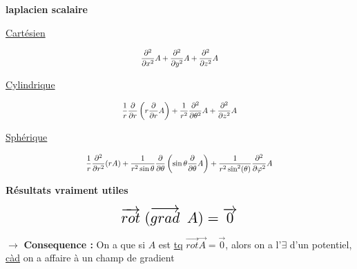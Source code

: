 \documentclass{article}
\newcommand{\vtab} {\vspace{0.4cm}}
\begin{document}
\begin{center}
	{\huge \textbf{laplacien scalaire}}
\end{center}

\vtab

\begin{center}
\begin{multicols}{3}
		{\Large \underline{Cartésien}} \\
\vtab

			$$\scalebox{0.8}{$\displaystyle \frac{\partial^2}{\partial x^2} A + \frac{\partial^2}{\partial y^2} A + \frac{\partial^2}{\partial z^2} A$}$$

	\columnbreak
		{\Large \underline{Cylindrique}} \\

\vtab

	$$\scalebox{0.8}{$\displaystyle \frac{1}{r} \frac{\partial}{\partial r} \left(r \frac{\partial}{\partial r} A \right) + \frac{1}{r^2}\frac{\partial^2}{\partial \theta^2} A + \frac{\partial^2}{\partial z^2} A $}$$

	
	\columnbreak
		{\Large \underline{Sphérique}} \\

\vtab

	$$\scalebox{0.8}{$\displaystyle \frac{1}{r} \frac{\partial^2}{\partial r^2} (r A) + \frac{1}{r^2 \sin \theta}\frac{\partial}{\partial \theta} \left(\sin \theta \frac{\partial}{\partial \theta} A \right)+ \frac{1}{r^2 \sin^2 (\theta)} \frac{\partial^2}{\partial \varphi^2} A $}$$
\end{multicols}
\end{center}

\vtab
\vtab

\newpage

\begin{center}
	{\huge \textbf{Résultats vraiment utiles}}
\end{center}

\vtab

$$\scalebox{1.5}{$\displaystyle \overrightarrow{rot} \hspace{3px} ( \overrightarrow{grad} \hspace{5px} A ) = \overrightarrow{0} $}$$

$\longrightarrow$ \textbf{{\Large Consequence :}} On a que si $A$ est \underline{tq} $\overrightarrow{rot} \overrightarrow{A} =  \overrightarrow{0}$, alors on a l'$\exists$ d'un potentiel, \underline{càd} on a affaire à un champ de gradient

\vtab
\end{document}
